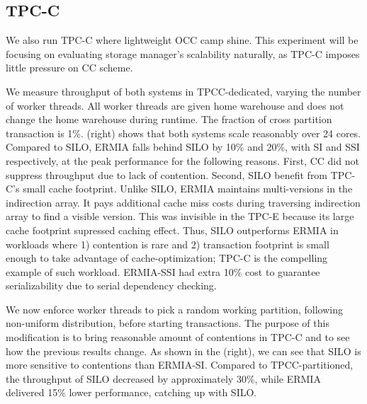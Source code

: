 \subsection{TPC-C} 
We also run TPC-C where lightweight OCC camp shine. This experiment will be focusing on evaluating storage manager's scalability naturally, as TPC-C imposes little pressure on CC scheme. 

We measure throughput of both systems in TPCC-dedicated, varying the number of worker threads. All worker threads are given home warehouse and does not change the home warehouse during runtime. The fraction of cross partition transaction is 1\%. (right) shows that both systems scale reasonably over 24 cores. Compared to SILO, ERMIA falls behind SILO by 10\% and 20\%, with SI and SSI respectively, at the peak performance for the following reasons. First, CC did not suppress throughput due to lack of contention. Second, SILO benefit from TPC-C's small cache footprint. Unlike SILO, ERMIA maintains multi-versions in the indirection array. It pays additional cache miss costs during traversing indirection array to find a visible version. This was invisible in the TPC-E because its large cache footprint supressed caching effect. Thus, SILO outperforms ERMIA in workloads where 1) contention is rare and 2) transaction footprint is small enough to take advantage of cache-optimization; TPC-C is the compelling example of such workload. ERMIA-SSI had extra 10\% cost to guarantee serializability due to serial dependency checking.

We now enforce worker threads to pick a random working partition, following non-uniform distribution, before starting transactions. The purpose of this modification is to bring reasonable amount of contentions in TPC-C and to see how the previous results change. As shown in the (right), we can see that SILO is more sensitive to contentions than ERMIA-SI. Compared to TPCC-partitioned, the throughput of SILO decreased by approximately 30\%, while ERMIA delivered 15\% lower performance, catching up with SILO.
%

